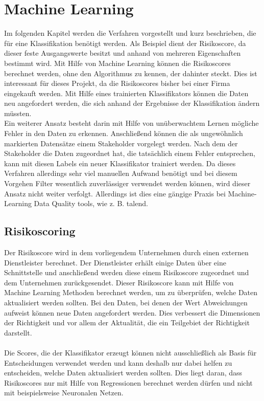 \section{Machine Learning}
Im folgenden Kapitel werden die Verfahren vorgestellt und kurz beschrieben, die für eine Klassifikation benötigt werden. 
Als Beispiel dient der Risikoscore, da dieser feste Ausgangswerte besitzt und anhand von mehreren Eigenschaften bestimmt wird. 
Mit Hilfe von Machine Learning können die Risikoscores berechnet werden, ohne den Algorithmus zu kennen, der dahinter steckt. 
Dies ist interessant für dieses Projekt, da die Risikoscores bisher bei einer Firma eingekauft werden.
Mit Hilfe eines trainierten Klassifikators können die Daten neu angefordert werden, die sich anhand der Ergebnisse der Klassifikation ändern müssten. 
\\
Ein weiterer Ansatz besteht darin mit Hilfe von unüberwachtem Lernen mögliche Fehler in den Daten zu erkennen.
Anschließend können die als ungewöhnlich markierten Datensätze einem Stakeholder vorgelegt werden.
Nach dem der Stakeholder die Daten zugeordnet hat, die tatsächlich einem Fehler entsprechen, kann mit diesen Labels ein neuer Klassifikator trainiert werden. 
Da dieses Verfahren allerdings sehr viel manuellen Aufwand benötigt und bei diesem Vorgehen Filter wesentlich zuverlässiger verwendet werden können, wird dieser Ansatz nicht weiter verfolgt.
Allerdings ist dies eine gängige Praxis bei Machine-Learning Data Quality tools, wie z. B. talend. 


\subsection{Risikoscoring}
Der Risikoscore wird in dem vorliegendem Unternehmen durch einen externen Dienstleister berechnet. 
Der Dienstleister erhält einige Daten über eine Schnittstelle und anschließend werden diese einem Risikoscore zugeordnet und dem Unternehmen zurückgesendet.
Dieser Risikoscore kann mit Hilfe von Machine Learning Methoden berechnet werden, um zu überprüfen, welche Daten aktualisiert werden sollten.
Bei den Daten, bei denen der Wert Abweichungen aufweist können neue Daten angefordert werden.
Dies verbessert die Dimensionen der Richtigkeit und vor allem der Aktualität, die ein Teilgebiet der Richtigkeit darstellt.
\\ \\
Die Scores, die der Klassifikator erzeugt können nicht ausschließlich als Basis für Entscheidungen verwendet werden und kann deshalb nur dabei helfen zu entscheiden, welche Daten aktualisiert werden sollten.
Dies liegt daran, dass Risikoscores nur mit Hilfe von Regressionen berechnet werden dürfen und nicht mit beispielsweise Neuronalen Netzen.



